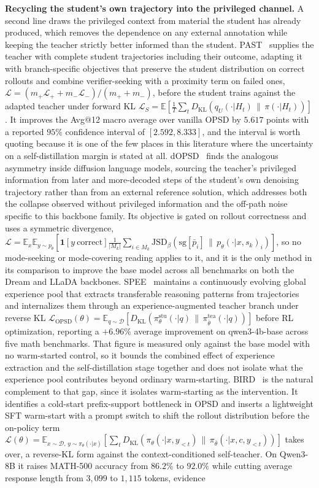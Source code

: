 \documentclass{article} %
\newcommand{\E}{\mathbb{E}}
\newcommand{\KL}{D_{\mathrm{KL}}}
\newcommand{\ptheta}{p_\theta}
\newcommand{\loss}{\mathcal{L}}
\begin{document}
\textbf{Recycling the student's own trajectory into the privileged channel.} A second line draws the privileged context from material the student has already produced, which removes the dependence on any external annotation while keeping the teacher strictly better informed than the student. PAST~\citep{2608.08726} supplies the teacher with complete student trajectories including their outcome, adapting it with branch-specific objectives that preserve the student distribution on correct rollouts and combine verifier-seeking with a proximity term on failed ones, $\loss = (m_+ \loss_+ + m_- \loss_-)/(m_+ + m_-)$, before the student trains against the adapted teacher under forward KL $\loss_S = \E[\frac{1}{T}\sum_t \KL(q_U(\cdot|H_t) \,\|\, \pi(\cdot|H_t))]$. It improves the Avg@12 macro average over vanilla OPSD by $5.617$ points with a reported $95\%$ confidence interval of $[2.592, 8.333]$, and the interval is worth quoting because it is one of the few places in this literature where the uncertainty on a self-distillation margin is stated at all. dOPSD~\citep{2607.04428} finds the analogous asymmetry inside diffusion language models, sourcing the teacher's privileged information from later and more-decoded steps of the student's own denoising trajectory rather than from an external reference solution, which addresses both the collapse observed without privileged information and the off-path noise specific to this backbone family. Its objective is gated on rollout correctness and uses a symmetric divergence, $\loss = \E_x \E_{y \sim \ptheta}[\mathbf{1}[y\ \text{correct}] \frac{1}{|M_k|}\sum_{i \in M_k} \mathrm{JSD}_\beta(\mathrm{sg}[\bar{p}_i] \,\|\, \ptheta(\cdot|x, s_k)_i)]$, so no mode-seeking or mode-covering reading applies to it, and it is the only method in its comparison to improve the base model across all benchmarks on both the Dream and LLaDA backbones. SPEE~\citep{2608.02139} maintains a continuously evolving global experience pool that extracts transferable reasoning patterns from trajectories and internalizes them through an experience-augmented teacher branch under reverse KL $\loss_{\text{OPSD}}(\theta) = \E_{q \sim \mathcal{D}}[\KL(\pi^{\text{stu}}_\theta(\cdot|q) \,\|\, \pi^{\text{tea}}_{\bar{\theta}}(\cdot|q))]$ before RL optimization, reporting a $+6.96\%$ average improvement on qwen3-4b-base across five math benchmarks. That figure is measured only against the base model with no warm-started control, so it bounds the combined effect of experience extraction and the self-distillation stage together and does not isolate what the experience pool contributes beyond ordinary warm-starting. BIRD~\citep{2607.15736} is the natural complement to that gap, since it isolates warm-starting as the intervention. It identifies a cold-start prefix-support bottleneck in OPSD and inserts a lightweight SFT warm-start with a prompt switch to shift the rollout distribution before the on-policy term $\loss(\theta) = \E_{x \sim \mathcal{D},\, y \sim \pi_\theta(\cdot|x)}[\sum_t \KL(\pi_\theta(\cdot|x, y_{<t}) \,\|\, \pi_{\bar{\theta}}(\cdot|x, c, y_{<t}))]$ takes over, a reverse-KL form against the context-conditioned self-teacher. On Qwen3-8B it raises MATH-500 accuracy from $86.2\%$ to $92.0\%$ while cutting average response length from $3{,}099$ to $1{,}115$ tokens, evidence 
\end{document}
